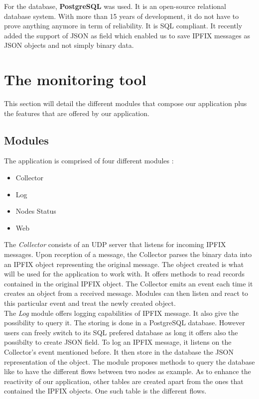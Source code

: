 For the database, \textbf{PostgreSQL} \cite{website:postgresql} was used. It is an open-source relational database system. With more than 15 years of development, it do not have to prove anything anymore in term of reliability. It is SQL compliant. It recently added the support of JSON as field which enabled us to save IPFIX messages as JSON objects and not simply binary data.

\section{The monitoring tool}

This section will detail the different modules that compose our application plus the features that are offered by our application.

\subsection{Modules}

The application is comprised of four different modules :
\begin{itemize}
	\item Collector
	\item Log
	\item Nodes Status
	\item Web \\
\end{itemize}

The \textit{Collector} consists of an UDP server that listens for incoming IPFIX messages. Upon reception of a message, the Collector parses the binary data into an IPFIX object representing the original message. The object created is what will be used for the application to work with. It offers methods to read records contained in the original IPFIX object. The Collector emits an event each time it creates an object from a received message. Modules can then listen and react to this particular event and treat the newly created object. \\

The \textit{Log} module offers logging capabilities of IPFIX message. It also give the possibility to query it. The storing is done in a PostgreSQL database. However users can freely switch to its SQL prefered database as long it offers also the possibilty to create JSON field. To log an IPFIX message, it listens on the Collector's event mentioned before. It then store in the database the JSON representation of the object. The module proposes methods to query the database like to have the different flows between two nodes as example. As to enhance the reactivity of our application, other tables are created apart from the ones that contained the IPFIX objects. One such table is the different flows.\\

